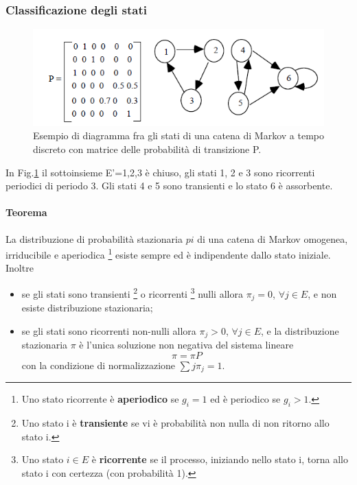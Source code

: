 \subsubsection{Classificazione degli stati}
\begin{figure}[H]
	\centering
    \includegraphics[width=15cm, keepaspectratio]{img/diagramma_Markov.png}
	\caption{Esempio di diagramma fra gli stati di una catena di Markov a tempo discreto
con matrice delle probabilità di transizione P.}\label{fig:diagr_Markov}
\end{figure}

In Fig.\ref{fig:diagr_Markov} il sottoinsieme E'={1,2,3} è chiuso, gli stati 1, 2 e 3 sono ricorrenti periodici di periodo 3. Gli stati 4 e 5 sono transienti e lo stato 6 è assorbente.

\paragraph{Teorema}
La distribuzione di probabilità stazionaria $pi$ di una catena di Markov omogenea, irriducibile e aperiodica \footnote{Uno stato ricorrente è\textbf{ aperiodico} se $g_i=1$ ed è periodico se $g_i>1$.} esiste sempre ed è indipendente dallo stato iniziale. Inoltre
\begin{itemize}
    \item se gli stati sono transienti \footnote{Uno stato i è \textbf{transiente} se vi è probabilità non nulla di non ritorno allo stato i.} o ricorrenti \footnote{Uno stato $i\in E$ è \textbf{ricorrente} se il processo, iniziando nello stato i, torna allo stato i con certezza (con probabilità 1).} nulli allora $\pi_j = 0$, $\forall j \in E$, e non esiste distribuzione stazionaria;
    \item se gli stati sono ricorrenti non-nulli allora $\pi_j > 0$, $\forall j \in E$, e la distribuzione stazionaria $\pi$ è l'unica soluzione non negativa del sistema lineare
    \[ \pi = \pi P\]
    con la condizione di normalizzazione $\sum j\pi_j = 1$.
\end{itemize}


